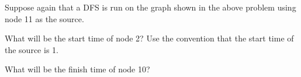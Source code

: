 \begin{prob}

    Suppose again that a DFS is run on the graph shown in the above problem using node 11
    as the source.
    
    \begin{subprobset}

        \begin{subprob}
            What will be the start time of node 2? Use the convention that the start time
            of the source is 1.


        \end{subprob}

        \begin{subprob}
            What will be the finish time of node 10?


        \end{subprob}

    \end{subprobset}

\end{prob}
